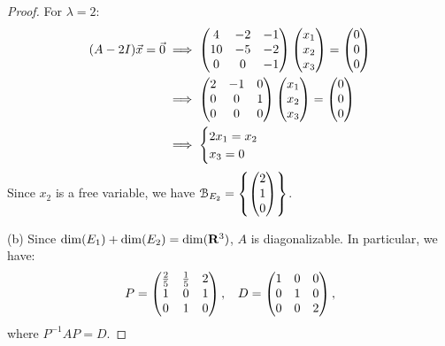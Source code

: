 \documentclass[10pt,twoside,openany]{memoir}
\begin{document}
{\begin{proof}
        For $\lambda = 2$:
            \begin{equation*}
            \begin{split}
                (A-2I)\vec{x} = \vec{0}
                & \implies \bmat 4 & -2 & -1 \\ 10 & -5 & -2 \\ 0 & 0 & -1 \emat \bmat x_1 \\ x_2 \\ x_3 \emat =\bmat 0 \\ 0 \\ 0 \emat \\
                & \implies \bmat 2 & -1 & 0 \\ 0 & 0 & 1 \\ 0 & 0 & 0 \emat \bmat x_1 \\ x_2 \\ x_3 \emat =\bmat 0 \\ 0 \\ 0 \emat \\
                & \implies \begin{cases}
                2x_1 = x_2 \\
                x_3 = 0
                \end{cases}
            \end{split}
            \end{equation*}
        Since $x_2$ is a free variable, we have $\cB_{E_2} = \left\{ \bmat 2 \\ 1 \\0 \emat \right\}$.

        (b) Since $\dim(E_1) + \dim(E_2) = \dim(\bfR^3)$, $A$ is diagonalizable. In particular, we have:
            \begin{equation*}
            \begin{split}
                P = \bmat \frac{2}{5} & \frac{1}{5} & 2 \\ 1 & 0 & 1 \\ 0 & 1 & 0 \emat,\h9 D = \bmat 1 & 0 & 0 \\ 0 & 1 & 0 \\ 0 & 0 & 2 \emat,
            \end{split}
            \end{equation*}
        where $P^{-1}AP = D$.
    \end{proof}}
\end{document}
